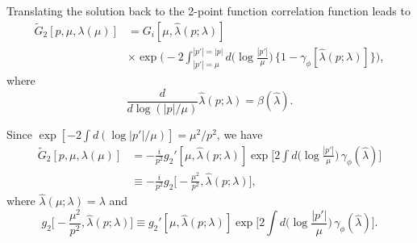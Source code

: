 Translating the solution back to the 2-point function correlation function leads to
\begin{equation}
    \begin{split}
        \tilde{G}_2[p,\mu,\lambda(\mu)]&= G_i[\mu,\hat{\lambda}(p;\lambda)] \\
        &\times \exp{\bigg(-2\int_{|p'|=\mu}^{|p'|=|p|}d\bigg(\log{\frac{|p'|}{\mu}}\bigg)\,\{1 - \gamma_\phi[\hat{\lambda}(p;\lambda)]\}\bigg)},
    \end{split}
\end{equation}
where
\begin{equation}
    \frac{d}{d\log{(|p|/\mu)}}\hat{\lambda}(p;\lambda) = \beta(\hat{\lambda}).
\end{equation}
\begin{obs}
    Since $\exp{[-2\int d(\log{|p'|/\mu})]} = \mu^2/p^2$, we have
    \begin{equation}
        \begin{split}
            \tilde{G}_2[p,\mu,\lambda(\mu)] &= -\frac{i}{p^2}g_2'[\mu,\hat{\lambda}(p;\lambda)]\exp{\bigg[2\int d\bigg(\log{\frac{|p'|}{\mu}}\bigg)\,\gamma_\phi(\hat{\lambda})\bigg]} \\
            &\equiv -\frac{i}{p^2}g_2\bigg[-\frac{\mu^2}{p^2},\hat{\lambda}(p;\lambda)\bigg],
        \end{split}
    \end{equation}
    where $\hat{\lambda}(\mu;\lambda) = \lambda$ and 
    \begin{equation}
        g_2\bigg[-\frac{\mu^2}{p^2},\hat{\lambda}(p;\lambda)\bigg] \equiv g_2'[\mu,\hat{\lambda}(p;\lambda)]\exp{\bigg[2\int d\bigg(\log{\frac{|p'|}{\mu}}\bigg)\,\gamma_\phi(\hat{\lambda})\bigg]}.
    \end{equation}
\end{obs}

